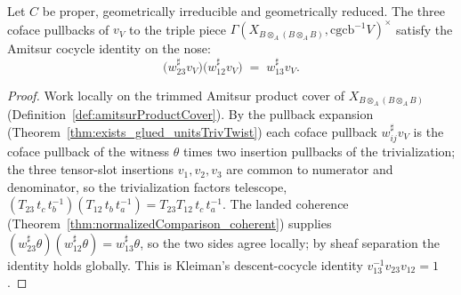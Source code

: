 \begin{theorem}
  \label{thm:pieceComparisonUnit_coherent}
  \leanok
  Let \(C\) be proper, geometrically irreducible and geometrically reduced. The three coface
  pullbacks of \(v_V\) to the triple piece \(\Gamma(X_{B \otimes_A (B \otimes_A B)},
  \mathrm{cgcb}^{-1}V)^{\times}\) satisfy the Amitsur cocycle identity on the nose:
  \[
    \bigl(w_{23}^{\sharp}v_V\bigr)\bigl(w_{12}^{\sharp}v_V\bigr) \;=\; w_{13}^{\sharp}v_V .
  \]
\end{theorem}
\begin{proof}
  \leanok
  Work locally on the trimmed Amitsur product cover of \(X_{B \otimes_A (B \otimes_A B)}\)
  (Definition~\ref{def:amitsurProductCover}). By the pullback expansion
  (Theorem~\ref{thm:exists_glued_unitsTrivTwist}) each coface pullback \(w_{ij}^{\sharp}v_V\) is the
  coface pullback of the witness \(\theta\) times two insertion pullbacks of the trivialization; the
  three tensor-slot insertions \(v_1, v_2, v_3\) are common to numerator and denominator, so the
  trivialization factors telescope, \((T_{23}\,t_c\,t_b^{-1})(T_{12}\,t_b\,t_a^{-1}) =
  T_{23}T_{12}\,t_c\,t_a^{-1}\). The landed coherence (Theorem~\ref{thm:normalizedComparison_coherent})
  supplies \((w_{23}^{\sharp}\theta)(w_{12}^{\sharp}\theta) = w_{13}^{\sharp}\theta\), so the two
  sides agree locally; by sheaf separation the identity holds globally. This is Kleiman's
  descent-cocycle identity \(v_{13}^{-1}v_{23}v_{12} = 1\).
\end{proof}

